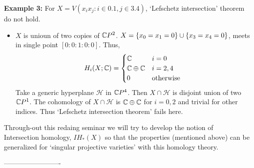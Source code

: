 \documentclass[11pt]{article}
\begin{document}
\pagebreak

\textbf{Example 3:} For $X = V(x_ix_j : i \in \qty{0,1}, j \in \qty{3,4})$, `Lefschetz intersection' theorem do not hold. 
\begin{itemize}
    \item[] $X$ is unioun of two copies of $\mathbb{C} P^2$. $X = \qty{x_0=x_1=0} \cup \qty{x_3=x_4=0}$, meets in single point $[0:0:1:0:0]$. Thus, \[
        H_i(X;\mathbb{C})=\begin{cases}
            \mathbb{C} & i=0\\
            \mathbb{C} \oplus \mathbb{C} & i=2,4 \\
            0  & \text{otherwise}
        \end{cases}
    \] 
    Take a generic hyperplane $\mathcal{H}$ in $\mathbb{C} P^4$. Then $X \cap \mathcal{H}$ is disjoint union of two  $\mathbb{C} P^1$. The cohomology of $X \cap \mathcal{H}$ is $\mathbb{C} \oplus \mathbb{C}$ for $i=0,2$ and trivial for other indices. Thus `Lefschetz intersection theorem' fails here.
\end{itemize}

\noindent \textcolor{darkcerulean}{Through-out this redaing seminar we will try to develop the notion of Intersection homology, $IH_{\ast}(X)$ so that the properties (mentioned above) can be generalized for `singular projective varieties' with this homology theory.}

\begin{center}
     ------------------------- 
\end{center}
\end{document}
